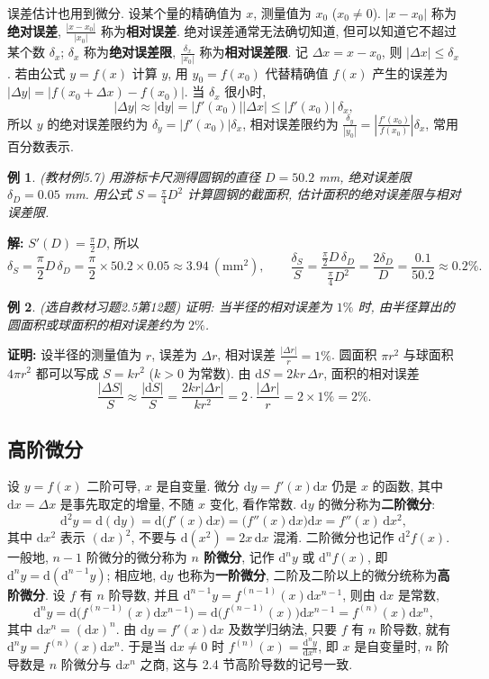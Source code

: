 \documentclass[UTF8,openany]{ctexbook}
\theoremstyle{chinesetextbook}
\newtheorem{example}{例}[section]
\newenvironment{cnproof}{\par\indent\textbf{证明:} \ignorespaces}{\par}
\newenvironment{cnsolution}{\par\indent\textbf{解:} \ignorespaces}{\par}
\newcommand{\dd}{\mathrm d}
\begin{document}
误差估计也用到微分. 设某个量的精确值为 $x$, 测量值为 $x_0$ ($x_0\ne0$). $|x-x_0|$ 称为\textbf{绝对误差}, $\displaystyle\frac{|x-x_0|}{|x_0|}$ 称为\textbf{相对误差}. 绝对误差通常无法确切知道, 但可以知道它不超过某个数 $\delta_x$; $\delta_x$ 称为\textbf{绝对误差限}, $\displaystyle\frac{\delta_x}{|x_0|}$ 称为\textbf{相对误差限}. 记 $\Delta x=x-x_0$, 则 $|\Delta x|\le\delta_x$. 若由公式 $y=f(x)$ 计算 $y$, 用 $y_0=f(x_0)$ 代替精确值 $f(x)$ 产生的误差为 $|\Delta y|=|f(x_0+\Delta x)-f(x_0)|$. 当 $\delta_x$ 很小时,
\[
|\Delta y|\approx|\dd y|=|f'(x_0)||\Delta x|\le|f'(x_0)|\,\delta_x,
\]
所以 $y$ 的绝对误差限约为 $\delta_y=|f'(x_0)|\delta_x$, 相对误差限约为 $\displaystyle\frac{\delta_y}{|y_0|}=\left|\frac{f'(x_0)}{f(x_0)}\right|\delta_x$, 常用百分数表示.
\begin{example}\label{ex:c2-5-7}
\textnormal{(教材例5.7)} 用游标卡尺测得圆钢的直径 $D=50.2$ mm, 绝对误差限 $\delta_D=0.05$ mm. 用公式 $\displaystyle S=\frac\pi4D^2$ 计算圆钢的截面积, 估计面积的绝对误差限与相对误差限.
\end{example}
\begin{cnsolution}
$\displaystyle S'(D)=\frac\pi2D$, 所以
\[
\delta_S=\frac\pi2D\,\delta_D=\frac\pi2\times50.2\times0.05\approx3.94\ (\text{mm}^2),\qquad\frac{\delta_S}S=\frac{\frac\pi2D\,\delta_D}{\frac\pi4D^2}=\frac{2\delta_D}D=\frac{0.1}{50.2}\approx0.2\%.
\]
\end{cnsolution}
\begin{example}\label{ex:c2-h5-12}
\textnormal{(选自教材习题2.5第12题)} 证明: 当半径的相对误差为 $1\%$ 时, 由半径算出的圆面积或球面积的相对误差约为 $2\%$.
\end{example}
\begin{cnproof}
设半径的测量值为 $r$, 误差为 $\Delta r$, 相对误差 $\displaystyle\frac{|\Delta r|}r=1\%$. 圆面积 $\pi r^2$ 与球面积 $4\pi r^2$ 都可以写成 $S=kr^2$ ($k>0$ 为常数). 由 $\dd S=2kr\,\Delta r$, 面积的相对误差
\[
\frac{|\Delta S|}S\approx\frac{|\dd S|}S=\frac{2kr|\Delta r|}{kr^2}=2\cdot\frac{|\Delta r|}r=2\times1\%=2\%.
\]
\end{cnproof}
\subsection{高阶微分}
设 $y=f(x)$ 二阶可导, $x$ 是自变量. 微分 $\dd y=f'(x)\dd x$ 仍是 $x$ 的函数, 其中 $\dd x=\Delta x$ 是事先取定的增量, 不随 $x$ 变化, 看作常数. $\dd y$ 的微分称为\textbf{二阶微分}:
\[
\dd^2y=\dd(\dd y)=\dd\bigl(f'(x)\dd x\bigr)=\bigl(f''(x)\dd x\bigr)\dd x=f''(x)\,\dd x^2,
\]
其中 $\dd x^2$ 表示 $(\dd x)^2$, 不要与 $\dd(x^2)=2x\,\dd x$ 混淆. 二阶微分也记作 $\dd^2f(x)$. 一般地, $n-1$ 阶微分的微分称为 \textbf{$n$ 阶微分}, 记作 $\dd^ny$ 或 $\dd^nf(x)$, 即 $\dd^ny=\dd(\dd^{n-1}y)$; 相应地, $\dd y$ 也称为\textbf{一阶微分}, 二阶及二阶以上的微分统称为\textbf{高阶微分}. 设 $f$ 有 $n$ 阶导数, 并且 $\dd^{n-1}y=f^{(n-1)}(x)\dd x^{n-1}$, 则由 $\dd x$ 是常数,
\[
\dd^ny=\dd\bigl(f^{(n-1)}(x)\dd x^{n-1}\bigr)=\dd\bigl(f^{(n-1)}(x)\bigr)\dd x^{n-1}=f^{(n)}(x)\dd x^n,
\]
其中 $\dd x^n=(\dd x)^n$. 由 $\dd y=f'(x)\dd x$ 及数学归纳法, 只要 $f$ 有 $n$ 阶导数, 就有 $\dd^ny=f^{(n)}(x)\dd x^n$. 于是当 $\dd x\ne0$ 时 $\displaystyle f^{(n)}(x)=\frac{\dd^ny}{\dd x^n}$, 即 $x$ 是自变量时, $n$ 阶导数是 $n$ 阶微分与 $\dd x^n$ 之商, 这与 2.4 节高阶导数的记号一致.
\end{document}

